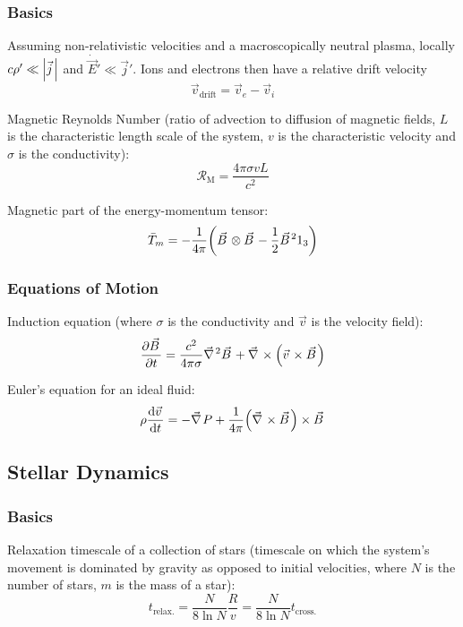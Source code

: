		\subsubsection{Basics}
			Assuming non-relativistic velocities and a macroscopically neutral plasma, \ie locally $c\rho' \ll \abs{\vec{j}}$ and $\dot{\vec{E}}' \ll \vec{j}'$.
			Ions and electrons then have a relative drift velocity
			\begin{equation}
				\vec{v}_{\text{drift}} = \vec{v}_e - \vec{v}_i
			\end{equation}

			\noindent
			Magnetic Reynolds Number (ratio of advection to diffusion of magnetic fields, $L$ is the characteristic length scale of the system, $v$ is the characteristic velocity and $\sigma$ is the conductivity):
			\begin{equation}
				\mathcal{R}_\text{M} = \frac{4\pi\sigma v L}{c^2}
			\end{equation}

			\noindent
			Magnetic part of the energy-momentum tensor:
			\begin{equation}
				\bar{T}_m = -\frac{1}{4\pi} \qty(\vec{B} \otimes \vec{B} - \frac{1}{2}\vec{B}^2 1_3)
			\end{equation}

		\subsubsection{Equations of Motion}
			Induction equation (where $\sigma$ is the conductivity and $\vec{v}$ is the velocity field):
			\begin{equation}
				\pdv{\vec{B}}{t} = \frac{c^2}{4\pi\sigma} \Nabla^2 \vec{B} + \Nabla\times\qty(\vec{v}\times\vec{B})
			\end{equation}

			\noindent
			Euler's equation for an ideal fluid:
			\begin{equation}
				\rho \dv{\vec{v}}{t} = - \Nabla P + \frac{1}{4\pi}\qty(\Nabla\times\vec{B})\times\vec{B}
			\end{equation}


	\subsection{Stellar Dynamics}
		\subsubsection{Basics}
			Relaxation timescale of a collection of stars (timescale on which the system's movement is dominated by gravity as opposed to initial velocities, where $N$ is the number of stars, $m$ is the mass of a star):
			\begin{equation}
				t_{\text{relax.}} = \frac{N}{8\ln N} \frac{R}{v} = \frac{N}{8\ln N} t_{\text{cross.}}
			\end{equation}

